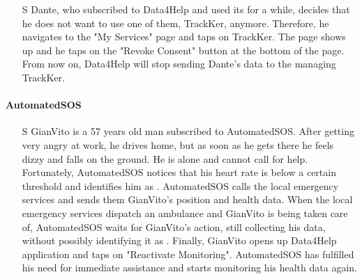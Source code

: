 \documentclass[../../rasd.tex]{subfiles}
\begin{document}
\begin{itemize}
                    \item[S\subs{6}] Dante, who subscribed to Data4Help and used its  for a while, decides that he does not want to use one of them, TrackKer, anymore. Therefore, he navigates to the "My Services" page and taps on TrackKer. The  page shows up and he taps on the "Revoke Consent" button at the bottom of the page. From now on, Data4Help will stop sending Dante's data to the  managing TrackKer.
                \end{itemize}

            \paragraph{AutomatedSOS}
                \begin{itemize}
                    \item[S\subs{7}] GianVito is a 57 years old man subscribed to AutomatedSOS. After getting very angry at work, he drives home, but as soon as he gets there he feels dizzy and falls on the ground. He is alone and cannot call for help. Fortunately, AutomatedSOS notices that his heart rate is below a certain threshold and identifies him as . AutomatedSOS calls the local emergency services and sends them GianVito's position and health data. When the local emergency services dispatch an ambulance and GianVito is being taken care of, AutomatedSOS waits for GianVito's action, still collecting his data, without possibly identifying it as . Finally, GianVito opens up Data4Help application and taps on "Reactivate Monitoring". AutomatedSOS has fulfilled his need for immediate assistance and starts monitoring his health data again.
                \end{itemize}
\end{document}
